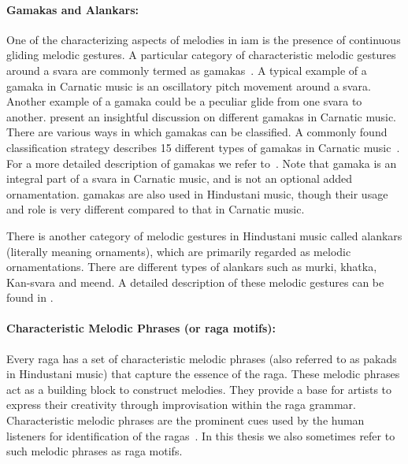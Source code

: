 \paragraph{Gamakas and Alankars:} One of the characterizing aspects of melodies in \gls{iam} is the presence of continuous gliding melodic gestures. A particular category of characteristic melodic gestures around a \gls{svara} are commonly termed as \glspl{gamaka}~\citep{krishna2012carnatic}. A typical example of a \gls{gamaka} in Carnatic music is an oscillatory pitch movement around a \gls{svara}. Another example of a \gls{gamaka} could be a peculiar glide from one \gls{svara} to another. \cite{krishna2012carnatic} present an insightful discussion on different \glspl{gamaka} in Carnatic music. There are various ways in which \glspl{gamaka} can be classified. A commonly found classification strategy describes 15 different types of \glspl{gamaka} in Carnatic music~\cite{ramanathan1999musical,janakiraman2008essentials,narayanswami2011}. For a more detailed description of \glspl{gamaka} we refer to~\citep{narayanswami2011}. Note that \gls{gamaka} is an integral part of a \gls{svara} in Carnatic music, and is not an optional added ornamentation. \Glspl{gamaka} are also used in Hindustani music, though their usage and role is very different compared to that in Carnatic music. 

There is another category of melodic gestures in Hindustani music called \glspl{alankar} (literally meaning ornaments), which are primarily regarded as melodic ornamentations. There are different types of \glspl{alankar} such as \gls{murki}, \gls{khatka}, Kan-\gls{svara} and \gls{meend}. A detailed description of these melodic gestures can be found in . 


\paragraph{Characteristic Melodic Phrases (or \gls{raga} motifs):} Every \gls{raga} has a set of characteristic melodic phrases (also referred to as pakads in Hindustani music) that capture the essence of the \gls{raga}. These melodic phrases act as a building block to construct melodies. They provide a base for artists to express their creativity through improvisation within the \gls{raga} grammar. Characteristic melodic phrases are the prominent cues used by the human listeners for identification of the \glspl{raga}~\citep{krishna2012carnatic}. In this thesis we also sometimes refer to such melodic phrases as \gls{raga} motifs.

